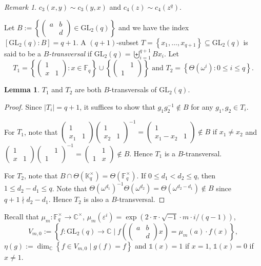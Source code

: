 \documentclass[12pt, reqno]{amsart}
\theoremstyle{definition}
\newtheorem{lemma}[theorem]{Lemma}
\theoremstyle{remark}
\newtheorem{remark}[theorem]{Remark}
\numberwithin{equation}{section}
\newcommand{\BC}{\mathbb{C}}
\newcommand{\BF}{\mathbb{F}}
\newcommand{\BK}{\mathbb{K}}
\newcommand{\ls}{\leqslant}
\newcommand{\pt}[1]{\left(#1\right)}
\newcommand{\cb}[1]{\left\{#1\right\}}
\newcommand{\fk}[1]{\left[#1\right]}
\newcommand{\abs}[1]{\left|#1\right|}
\newcommand{\GL}{\mathrm{GL}}
\newcommand{\jz}[4]{{\begin{pmatrix}
		#1&#2\\
		#3&#4
\end{pmatrix}}}
\newcommand{\one}{\mathds{1}}
\begin{document}
\begin{remark}
	
	$c_3(x, y) \sim c_3(y, x)$ and $c_4(z) \sim c_4(z^q)$.	
	
\end{remark}

Let $B := \cb{\jz{a}{b}{}{d} \in \GL_2(q)}$ and we have the index $\fk{\GL_2(q): B} = q + 1$. A $(q + 1)$-subset $T = \cb{x_1, \ldots, x_{q + 1}} \subseteq \GL_2(q)$ is said to be a \emph{$B$-transversal} if $\GL_2(q) = \biguplus_{i = 1}^{q + 1}Bx_i$. Let
\[T_1 = \cb{\jz{1}{}{x}{1}: x \in \BF_q} \cup \cb{\jz{}{1}{1}{}} \text{ and } T_2 = \cb{\Theta(\omega^i): 0 \ls i \ls q}.\]

\begin{lemma}
	
	$T_1$ and $T_2$ are both $B$-transversals of $\GL_2(q)$.	
	
\end{lemma}

\begin{proof}
	
	Since $\abs{T_i} = q + 1$, it suffices to show that $g_1g_2^{-1} \notin B$ for any $g_1, g_2 \in T_i$.
	
	For $T_1$, note that
	$\jz{1}{}{x_1}{1}\jz{1}{}{x_2}{1}^{-1} = \jz{1}{}{x_1 - x_2}{1} \notin B \text{ if } x_1 \ne x_2$
	and
	$\jz{1}{}{x}{1}\jz{}{1}{1}{}^{-1} = \jz{}{1}{1}{x} \notin B$.
	Hence $T_1$ is a $B$-transversal.
	
	For $T_2$, note that $B \cap \Theta\pt{\BK_q^\times} = \Theta(\BF_q^\times)$. If $0 \ls d_1 < d_2 \ls q$, then $1 \ls d_2 - d_1 \ls q$. Note that
	$\Theta(\omega^{d_1})^{-1}\Theta(\omega^{d_2}) = \Theta(\omega^{d_2 - d_1}) \notin B$ since $q + 1 \nmid d_2 - d_1$.
	Hence $T_2$ is also a $B$-transversal.\qedhere
	
\end{proof}

Recall that $\mu_m: \BF_q^\times \rightarrow \BC^\times$, $\mu_m(\varepsilon^i) = \exp\pt{2\cdot\pi\cdot\sqrt{-1}\cdot m \cdot i/(q - 1)}$,
\[V_{m, 0} := \cb{f: \GL_2(q) \rightarrow \BC \;|\; f\pt{\jz{a}{b}{}{d}x} = \mu_m(a) \cdot f(x)},\]
$\eta(g) := \dim_\BC\cb{f \in V_{m, 0} \;|\; g(f) = f}$ and $\one(x) = 1$ if $x = 1$, $\one(x) = 0$ if $x \ne 1$.
\end{document}

